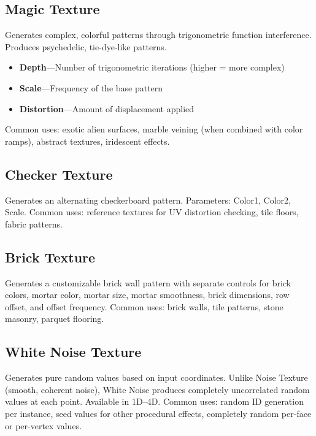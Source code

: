 \subsection{Magic Texture}

Generates complex, colorful patterns through trigonometric function
interference. Produces psychedelic, tie-dye-like patterns.

\begin{itemize}[leftmargin=2em]
  \item \textbf{Depth}---Number of trigonometric iterations (higher = more complex)
  \item \textbf{Scale}---Frequency of the base pattern
  \item \textbf{Distortion}---Amount of displacement applied
\end{itemize}

Common uses: exotic alien surfaces, marble veining (when combined
with color ramps), abstract textures, iridescent effects.

\subsection{Checker Texture}

Generates an alternating checkerboard pattern. Parameters: Color1,
Color2, Scale. Common uses: reference textures for UV distortion
checking, tile floors, fabric patterns.

\subsection{Brick Texture}

Generates a customizable brick wall pattern with separate controls
for brick colors, mortar color, mortar size, mortar smoothness,
brick dimensions, row offset, and offset frequency. Common uses:
brick walls, tile patterns, stone masonry, parquet flooring.

\subsection{White Noise Texture}

Generates pure random values based on input coordinates. Unlike
Noise Texture (smooth, coherent noise), White Noise produces
completely uncorrelated random values at each point. Available in
1D--4D. Common uses: random ID generation per instance, seed values
for other procedural effects, completely random per-face or
per-vertex values.

